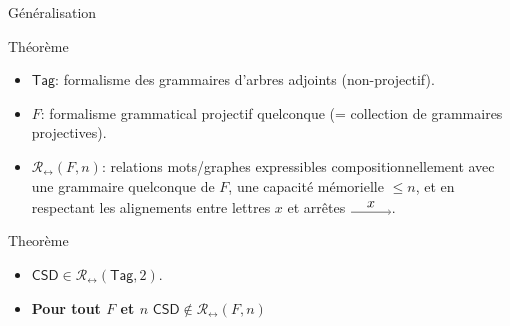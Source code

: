 \documentclass{beamer}
\newcommand{\hidden}[1]{}
\begin{document}
{\begin{frame}{G\'en\'eralisation}
\end{frame}


\begin{frame}{Th\'eor\`eme}
 
  \begin{itemize}
  \item $\mathsf{Tag}$: formalisme des grammaires d'arbres adjoints (non-projectif).
  \item $F$: formalisme grammatical projectif quelconque (= collection de grammaires projectives).
  \item $\mathcal{R}_{\leftrightarrow}(F, n)$: relations mots/graphes expressibles compositionnellement avec une grammaire quelconque de $F$, une capacit\'e m\'emorielle $\le n$, et en respectant les alignements entre lettres $x$ et arr\^etes $\begin{tikzpicture}[] \path (0,0) edge[->] node[above, midway] {$x$} (1,0); \end{tikzpicture}$. 
  \end{itemize}
  
  \begin{block}{Theor\`eme}
    \begin{itemize}
    \item $\mathsf{CSD} \in \mathcal{R}_{\leftrightarrow}(\mathsf{Tag}, 2)$.
    \item \textbf{Pour tout $F$ et $n$} $\mathsf{CSD} \notin \mathcal{R}_{\leftrightarrow}(F, n)$
    \end{itemize}
  \end{block}
\end{frame}



\hidden{
\begin{frame}{Diff\'erents types de marqueurs.}

  \begin{block}{Conscencus s\'emantique:}
    \begin{itemize}
    \item Remplacer un marqueur temporaire du foncteur par son argument.
    \end{itemize}
  \end{block}

  \begin{alertblock}{Divergence}
    \begin{itemize}
    \item Quel type de marqueur?
    \item Solution 1: nommer (par ex. $\langle s \rangle$) les marqueurs, et op\'erations de subsitution correspondantes ($App_c$) $\rightarrow$ marqueurs en nombre fini.
    \item Solution 2: 'structurer' les marqueurs en imposant un ordre d'utilisation $\rightarrow$ .
    \end{itemize} 
  \end{alertblock}

\end{frame}
}
}
\end{document}
